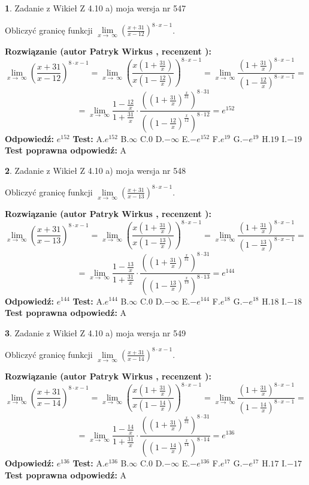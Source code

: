\documentclass[12pt, a4paper]{article}
\theoremstyle{definition} %
\newtheorem{zad}{}
\newcommand{\zadStart}[1]{\begin{zad}#1\newline}
\newcommand{\zadStop}{\end{zad}}
\newcommand{\rozwStart}[2]{\noindent \textbf{Rozwiązanie (autor #1 , recenzent #2): }\newline}
\newcommand{\rozwStop}{\newline}
\newcommand{\odpStart}{\noindent \textbf{Odpowiedź:}\newline}
\newcommand{\odpStop}{\newline}
\newcommand{\testStart}{\noindent \textbf{Test:}\newline}
\newcommand{\testStop}{\newline}
\newcommand{\kluczStart}{\noindent \textbf{Test poprawna odpowiedź:}\newline}
\newcommand{\kluczStop}{\newline}
\begin{document}
\zadStart{Zadanie z Wikieł Z 4.10 a) moja wersja nr 547}

Obliczyć granicę funkcji  $\lim\limits_{x\to\ \infty}(\frac{x+31}{x-12})^{8\cdot x-1}$.
\zadStop
\rozwStart{Patryk Wirkus}{}
$$\lim\limits_{x\to\ \infty}(\frac{x+31}{x-12})^{8\cdot x-1} = \lim\limits_{x\to\ \infty}(\frac{x(1+\frac{31}{x})}{x(1-\frac{12}{x})})^{8\cdot x-1}=\lim\limits_{x\to\ \infty}\frac{(1+\frac{31}{x})^{8\cdot x-1}}{(1-\frac{12}{x})^{8\cdot x-1}}=$$
$$=\lim\limits_{x\to\ \infty}\frac{1-\frac{12}{x}}{1+\frac{31}{x}}\cdot\frac{((1+\frac{31}{x})^{\frac{x}{31}})^{8\cdot31}}{((1-\frac{12}{x})^{\frac{x}{12}})^{8\cdot12}}=e^{152}$$
\rozwStop
\odpStart
$e^{152}$
\odpStop
\testStart
A.$e^{152}$ B.$\infty$ C.$0$ D.$-\infty$ E.$-e^{152}$
F.$e^{19}$ G.$-e^{19}$
H.$19$
I.$-19$
\testStop
\kluczStart
A
\kluczStop



\zadStart{Zadanie z Wikieł Z 4.10 a) moja wersja nr 548}

Obliczyć granicę funkcji  $\lim\limits_{x\to\ \infty}(\frac{x+31}{x-13})^{8\cdot x-1}$.
\zadStop
\rozwStart{Patryk Wirkus}{}
$$\lim\limits_{x\to\ \infty}(\frac{x+31}{x-13})^{8\cdot x-1} = \lim\limits_{x\to\ \infty}(\frac{x(1+\frac{31}{x})}{x(1-\frac{13}{x})})^{8\cdot x-1}=\lim\limits_{x\to\ \infty}\frac{(1+\frac{31}{x})^{8\cdot x-1}}{(1-\frac{13}{x})^{8\cdot x-1}}=$$
$$=\lim\limits_{x\to\ \infty}\frac{1-\frac{13}{x}}{1+\frac{31}{x}}\cdot\frac{((1+\frac{31}{x})^{\frac{x}{31}})^{8\cdot31}}{((1-\frac{13}{x})^{\frac{x}{13}})^{8\cdot13}}=e^{144}$$
\rozwStop
\odpStart
$e^{144}$
\odpStop
\testStart
A.$e^{144}$ B.$\infty$ C.$0$ D.$-\infty$ E.$-e^{144}$
F.$e^{18}$ G.$-e^{18}$
H.$18$
I.$-18$
\testStop
\kluczStart
A
\kluczStop



\zadStart{Zadanie z Wikieł Z 4.10 a) moja wersja nr 549}

Obliczyć granicę funkcji  $\lim\limits_{x\to\ \infty}(\frac{x+31}{x-14})^{8\cdot x-1}$.
\zadStop
\rozwStart{Patryk Wirkus}{}
$$\lim\limits_{x\to\ \infty}(\frac{x+31}{x-14})^{8\cdot x-1} = \lim\limits_{x\to\ \infty}(\frac{x(1+\frac{31}{x})}{x(1-\frac{14}{x})})^{8\cdot x-1}=\lim\limits_{x\to\ \infty}\frac{(1+\frac{31}{x})^{8\cdot x-1}}{(1-\frac{14}{x})^{8\cdot x-1}}=$$
$$=\lim\limits_{x\to\ \infty}\frac{1-\frac{14}{x}}{1+\frac{31}{x}}\cdot\frac{((1+\frac{31}{x})^{\frac{x}{31}})^{8\cdot31}}{((1-\frac{14}{x})^{\frac{x}{14}})^{8\cdot14}}=e^{136}$$
\rozwStop
\odpStart
$e^{136}$
\odpStop
\testStart
A.$e^{136}$ B.$\infty$ C.$0$ D.$-\infty$ E.$-e^{136}$
F.$e^{17}$ G.$-e^{17}$
H.$17$
I.$-17$
\testStop
\kluczStart
A
\kluczStop
\end{document}
